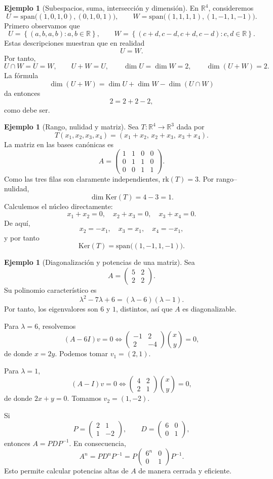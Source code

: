 \documentclass[10pt,a4paper,oneside]{article}
\theoremstyle{plain}
\theoremstyle{definition}
\newtheorem{example}[theorem]{Ejemplo}
\theoremstyle{remark}
\newcommand{\R}{\mathbb{R}}
\newcommand{\Ker}{\mathrm{Ker}}
\newcommand{\rk}{\mathrm{rk}}
\newcommand{\Span}{\mathrm{span}}
\newcommand{\set}[1]{\left\{ #1 \right\}}
\begin{document}
\begin{example}[Subespacios, suma, intersección y dimensión]
En \(\R^4\), consideremos
\[
U=\Span\bigl((1,0,1,0),(0,1,0,1)\bigr),
\qquad
W=\Span\bigl((1,1,1,1),(1,-1,1,-1)\bigr).
\]
Primero observamos que
\[
U=\set{(a,b,a,b):a,b\in\R},
\qquad
W=\set{(c+d,c-d,c+d,c-d):c,d\in\R}.
\]
Estas descripciones muestran que en realidad
\[
U=W.
\]
Por tanto,
\[
U\cap W=U=W,
\qquad
U+W=U,
\qquad
\dim U=\dim W=2,
\qquad
\dim(U+W)=2.
\]
La fórmula
\[
\dim(U+W)=\dim U+\dim W-\dim(U\cap W)
\]
da entonces
\[
2=2+2-2,
\]
como debe ser.
\end{example}

\begin{example}[Rango, nulidad y matriz]
Sea \(T:\R^4\to\R^3\) dada por
\[
T(x_1,x_2,x_3,x_4)=(x_1+x_2,\,x_2+x_3,\,x_3+x_4).
\]
La matriz en las bases canónicas es
\[
A=
\begin{pmatrix}
1 & 1 & 0 & 0\\
0 & 1 & 1 & 0\\
0 & 0 & 1 & 1
\end{pmatrix}.
\]
Como las tres filas son claramente independientes, \(\rk(T)=3\). Por rango--nulidad,
\[
\dim\Ker(T)=4-3=1.
\]
Calculemos el núcleo directamente:
\[
x_1+x_2=0,\quad x_2+x_3=0,\quad x_3+x_4=0.
\]
De aquí,
\[
x_2=-x_1,\quad x_3=x_1,\quad x_4=-x_1,
\]
y por tanto
\[
\Ker(T)=\Span\bigl((1,-1,1,-1)\bigr).
\]
\end{example}

\begin{example}[Diagonalización y potencias de una matriz]
Sea
\[
A=
\begin{pmatrix}
5 & 2\\
2 & 2
\end{pmatrix}.
\]
Su polinomio característico es
\[
\lambda^2-7\lambda+6=(\lambda-6)(\lambda-1).
\]
Por tanto, los eigenvalores son \(6\) y \(1\), distintos, así que \(A\) es diagonalizable.

Para \(\lambda=6\), resolvemos
\[
(A-6I)v=0
\iff
\begin{pmatrix}
-1 & 2\\
2 & -4
\end{pmatrix}
\binom{x}{y}=0,
\]
de donde \(x=2y\). Podemos tomar \(v_1=(2,1)\).

Para \(\lambda=1\),
\[
(A-I)v=0
\iff
\begin{pmatrix}
4 & 2\\
2 & 1
\end{pmatrix}
\binom{x}{y}=0,
\]
de donde \(2x+y=0\). Tomamos \(v_2=(1,-2)\).

Si
\[
P=
\begin{pmatrix}
2 & 1\\
1 & -2
\end{pmatrix},
\qquad
D=
\begin{pmatrix}
6 & 0\\
0 & 1
\end{pmatrix},
\]
entonces \(A=PDP^{-1}\). En consecuencia,
\[
A^n=PD^nP^{-1}=P
\begin{pmatrix}
6^n & 0\\
0 & 1
\end{pmatrix}P^{-1}.
\]
Esto permite calcular potencias altas de \(A\) de manera cerrada y eficiente.
\end{example}
\end{document}
